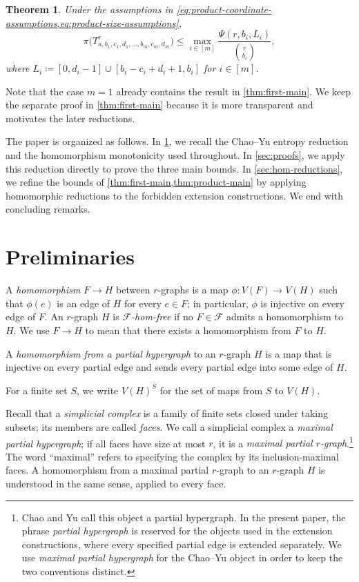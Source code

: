 \documentclass[10pt,a4paper]{article}
\theoremstyle{plain}
\newtheorem{theorem}{Theorem}[section]
\theoremstyle{definition}
\theoremstyle{plain}
\newcommand{\calF}{\mathcal F}
\begin{document}
\begin{theorem}\label{thm:product-main}
Under the assumptions in \cref{eq:product-coordinate-assumptions,eq:product-size-assumptions},
\[
        \pi\bigl(T^r_{a,b_1,c_1,d_1,\ldots,b_m,c_m,d_m}\bigr)
        \le
        \max_{i\in[m]}\frac{\Psi(r,b_i,L_i)}{\binom{r}{b_i}}, 
\]
where $L_i\coloneqq[0,d_i-1]\cup[b_i-c_i+d_i+1,b_i]$ for $i \in [m]$. 
\end{theorem}

Note that the case $m=1$ already contains the result in \cref{thm:first-main}.  We keep the separate proof in \cref{thm:first-main} because it is more transparent and motivates the later reductions.

The paper is organized as follows.  In \cref{SEC:Preliminaries}, we recall the Chao--Yu entropy reduction and the homomorphism monotonicity used throughout.  In \cref{sec:proofs}, we apply this reduction directly to prove the three main bounds.  In \cref{sec:hom-reductions}, we refine the bounds of \cref{thm:first-main,thm:product-main} by applying homomorphic reductions to the forbidden extension constructions.  We end with concluding remarks.

\section{Preliminaries}\label{SEC:Preliminaries}

A \emph{homomorphism} $F\to H$ between $r$-graphs is a map $\phi:V(F)\to V(H)$ such that $\phi(e)$ is an edge of $H$ for every $e\in F$; in particular, $\phi$ is injective on every edge of $F$.  An $r$-graph $H$ is \emph{$\calF$-hom-free} if no $F\in\calF$ admits a homomorphism to $H$.
We use $F\to H$ to mean that there exists a homomorphism from $F$ to $H$. 

A \emph{homomorphism from a partial hypergraph} to an $r$-graph $H$ is a map that is injective on every partial edge and sends every partial edge into some edge of $H$.

For a finite set $S$, we write $V(H)^S$ for the set of maps from $S$ to $V(H)$.

Recall that a \emph{simplicial complex} is a family of finite sets closed under taking subsets; its members are called \emph{faces}. 
We call a simplicial complex a \emph{maximal partial hypergraph}; if all faces have size at most $r$, it is a \emph{maximal partial $r$-graph}.\footnote{Chao and Yu \cite{CY24} call this object a partial hypergraph.  In the present paper, the phrase \emph{partial hypergraph} is reserved for the objects used in the extension constructions, where every specified partial edge is extended separately.  We use \emph{maximal partial hypergraph} for the Chao--Yu object in order to keep the two conventions distinct.}  The word ``maximal'' refers to specifying the complex by its inclusion-maximal faces.  A homomorphism from a maximal partial $r$-graph to an $r$-graph $H$ is understood in the same sense, applied to every face.
\end{document}
